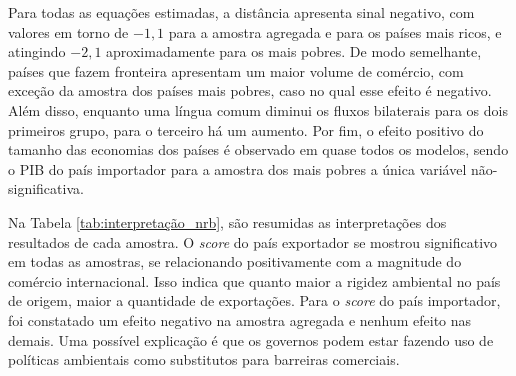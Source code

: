 Para todas as equações estimadas, a distância apresenta sinal negativo, com valores em torno de $-1,1$ para a amostra agregada e para os países mais ricos, e atingindo $-2,1$ aproximadamente para os mais pobres. De modo semelhante, países que fazem fronteira apresentam um maior volume de comércio, com exceção da amostra dos países mais pobres, caso no qual esse efeito é negativo. Além disso, enquanto uma língua comum diminui os fluxos bilaterais para os dois primeiros grupo, para o terceiro há um aumento. Por fim, o efeito positivo do tamanho das economias dos países é observado em quase todos os modelos, sendo o PIB do país importador para a amostra dos mais pobres a única variável não-significativa.

Na Tabela \ref{tab:interpretação_nrb}, são resumidas as interpretações dos resultados de cada amostra. O \textit{score} do país exportador se mostrou significativo em todas as amostras, se relacionando positivamente com a magnitude do comércio internacional. Isso indica que quanto maior a rigidez ambiental no país de origem, maior a quantidade de exportações. Para o \textit{score} do país importador, foi constatado um efeito negativo na amostra agregada e nenhum efeito nas demais. Uma possível explicação é que os governos podem estar fazendo uso de políticas ambientais como substitutos para barreiras comerciais.


